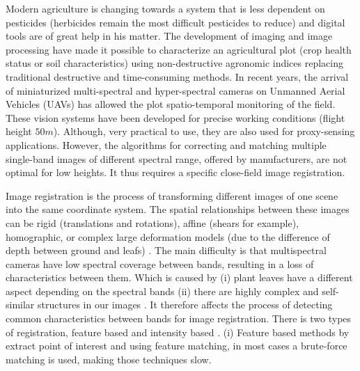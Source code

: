 \documentclass[]{elsarticle}
\begin{document}
	\par Modern agriculture is changing towards a system that is less dependent on pesticides \cite{10.1371/journal.pone.0097922}
	(herbicides remain the most difficult pesticides to reduce) and digital tools are of great help in his matter.
	The development of imaging and image processing have made it possible to characterize an agricultural plot \cite{SANKARAN2015112}
	(crop health status or soil characteristics) using non-destructive agronomic indices \cite{doi:10.1080/02757259509532298, filella1995evaluating, 10.1371/journal.pone.0072736}
	replacing traditional destructive and time-consuming methods.
	In recent years, the arrival of miniaturized multi-spectral and hyper-spectral cameras on Unmanned Aerial Vehicles (UAVs)
	has allowed the plot spatio-temporal monitoring of the field. These vision systems have been developed for precise working conditions (flight height $50m$).
	Although, very practical to use, they are also used for proxy-sensing applications.
	However, the algorithms for correcting and matching multiple single-band images of different spectral range,
	offered by manufacturers, are not optimal for low heights. It thus requires a specific close-field image registration.
	\\
	\par Image registration is the process of transforming different images of one scene into the same coordinate system.
	The spatial relationships between these images can be rigid (translations and rotations), affine (shears for example),
	homographic, or complex large deformation models (due to the difference of depth between ground and leafs) \cite{Kamoun}.
	The main difficulty is that multispectral cameras have low spectral coverage between bands, resulting in a loss of characteristics between them.
	Which is caused by (i) plant leaves have a different aspect depending on the spectral bands
	(ii) there are highly complex and self-similar structures in our images \cite{douarre:hal-02183837}.
	It therefore affects the process of detecting common characteristics between bands for image registration.
	There is two types of registration, feature based and intensity based \cite{Zitova}.
	(i) Feature based methods by extract point of interest and using feature matching, in most cases a brute-force matching is used, making those techniques slow.
\end{document}
